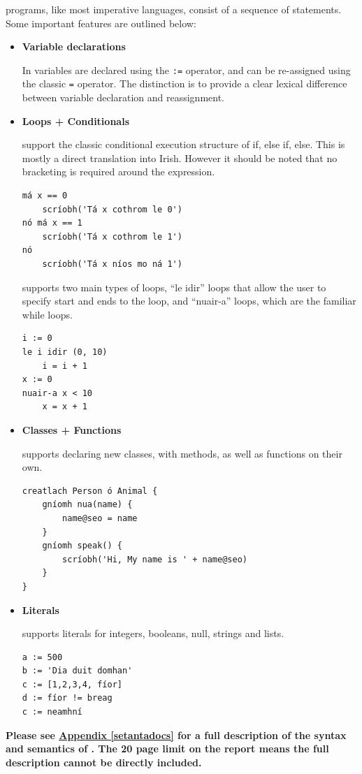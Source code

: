 \Setanta{} programs, like most imperative languages, consist of a sequence of statements. Some important \Setanta{} features are outlined below:
\begin{itemize}
    \item \textbf{Variable declarations}

        In \Setanta{} variables are declared using the \verb|:=| operator, and can be re-assigned using the classic \verb|=| operator. The distinction is to provide a clear lexical difference between variable declaration and reassignment.
    \item \textbf{Loops + Conditionals}

        \Setanta{} support the classic conditional execution structure of if, else if, else. This is mostly a direct translation into Irish. However it should be noted that no bracketing is required around the expression.

            \begin{lstlisting}[language=setanta, frame=single, caption=Setanta conditionals]
má x == 0
    scríobh('Tá x cothrom le 0')
nó má x == 1
    scríobh('Tá x cothrom le 1')
nó
    scríobh('Tá x níos mo ná 1')
            \end{lstlisting}

            \Setanta{} supports two main types of loops, ``le idir'' loops that allow the user to specify start and ends to the loop, and ``nuair-a'' loops, which are the familiar while loops.

            \begin{lstlisting}[language=setanta, frame=single, caption=Setanta loops]
i := 0
le i idir (0, 10)
    i = i + 1
x := 0
nuair-a x < 10
    x = x + 1
            \end{lstlisting}
        \item \textbf{Classes + Functions}

            \Setanta{} supports declaring new classes, with methods, as well as functions on their own.
            \begin{lstlisting}[language=setanta, frame=single, caption=Setanta classes]
creatlach Person ó Animal {
    gníomh nua(name) {
        name@seo = name
    }
    gníomh speak() {
        scríobh('Hi, My name is ' + name@seo)
    }
}
            \end{lstlisting}
        \item \textbf{Literals}

            \Setanta{} supports literals for integers, booleans, null, strings and lists.
            \begin{lstlisting}[language=setanta, frame=single, caption=Setanta literals]
a := 500
b := 'Dia duit domhan'
c := [1,2,3,4, fíor]
d := fíor != breag
c := neamhní
            \end{lstlisting}

\end{itemize}
            \noindent\textbf{Please see \hyperref[setantadocs]{Appendix \ref*{setantadocs}} for a full description of the syntax and semantics of \Setanta{}. The 20 page limit on the report means the full description cannot be directly included.}

